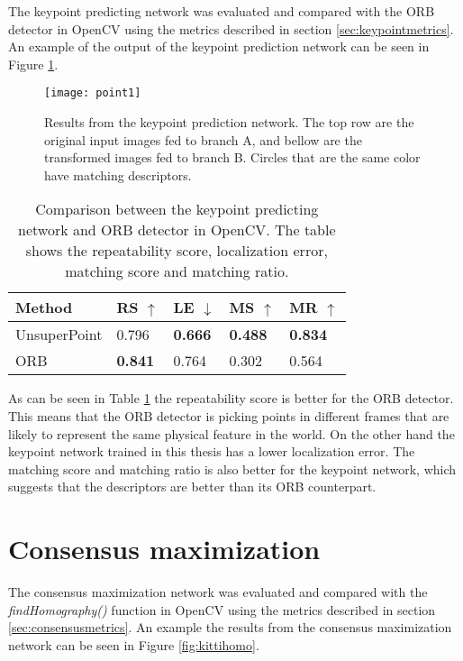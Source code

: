 The keypoint predicting network was evaluated and compared with the ORB detector in OpenCV using the metrics described in section \ref{sec:keypointmetrics}. An example of the output of the keypoint prediction network can be seen in Figure \ref{fig:point1}.

\begin{figure}[H]
	\centering
	\texttt{[image: point1]}
	\caption{Results from the keypoint prediction network. The top row are the original input images fed to branch A, and bellow are the transformed images fed to branch B. Circles that are the same color have matching descriptors.}
	\label{fig:point1}
\end{figure}

\begin{table}[H]
\centering
\begin{tabular}{|l|l|l|l|l|}
\hline
Method & RS $\uparrow$ & LE $\downarrow$ & MS $\uparrow$ & MR $\uparrow$ \\
\hline
UnsuperPoint & 0.796 & \textbf{0.666} & \textbf{0.488} & \textbf{0.834} \\
ORB & \textbf{0.841} & 0.764 & 0.302 & 0.564 \\
\hline
\end{tabular}
\caption{Comparison between the keypoint predicting network and ORB detector in OpenCV. The table shows the repeatability score, localization error, matching score and matching ratio.}
\label{table:pointsbenchmark}
\end{table}

As can be seen in Table \ref{table:pointsbenchmark} the repeatability score is better for the ORB detector. This means that the ORB detector is picking points in different frames that are likely to represent the same physical feature in the world. On the other hand the keypoint network trained in this thesis has a lower localization error. The matching score and matching ratio is also better for the keypoint network, which suggests that the descriptors are better than its ORB counterpart.

\section{Consensus maximization}
The consensus maximization network was evaluated and compared with the \textit{findHomography()} function in OpenCV using the metrics described in section \ref{sec:consensusmetrics}. An example the results from the consensus maximization network can be seen in Figure \ref{fig:kittihomo}.

